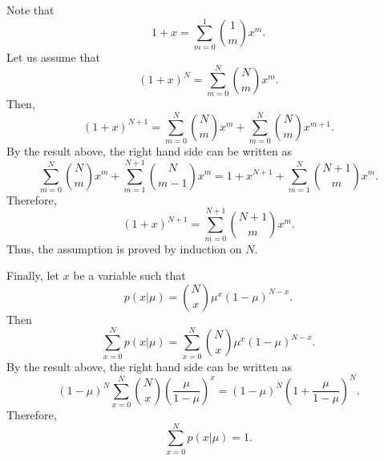 Note that 
%
\begin{equation}
1 + x = \sum_{m = 0}^{1} {1 \choose m} x ^ m.
\end{equation}
%
Let us assume that 
%
\begin{equation}
(1 + x) ^ N = \sum_{m = 0}^{N} {N \choose m} x ^ m.
\end{equation}
%
Then,
%
\begin{equation}
(1 + x) ^ {N + 1} = \sum_{m = 0}^{N} {N \choose m} x ^ m + \sum_{m = 0}^{N} {N \choose m} x ^ {m + 1}.
\end{equation}
%
By the result above, the right hand side can be written as
%
\begin{equation}
\sum_{m = 0}^{N} {N \choose m} x ^ m + \sum_{m = 1}^{N + 1} {N \choose m - 1} x ^ m = 1 + x ^ {N + 1} + \sum_{m = 1}^{N} {N + 1 \choose m} x ^ m.
\end{equation}
%
Therefore,
%
\begin{equation}
(1 + x) ^ {N + 1} = \sum_{m = 0}^{N + 1} {N + 1 \choose m} x ^ m.
\end{equation}
%
Thus, the assumption is proved by induction on $N$.

Finally, let $x$ be a variable such that
%
\begin{equation}
p(x | \mu) = {N \choose x} \mu ^ x (1 - \mu) ^ {N - x}.
\end{equation}
%
Then
%
\begin{equation}
\sum_{x = 0}^{N} p(x | \mu) = \sum_{x = 0}^{N} {N \choose x} \mu ^ x (1 - \mu) ^ {N - x}.
\end{equation}
%
By the result above, the right hand side can be written as
%
\begin{equation}
(1 - \mu) ^ N \sum_{x = 0}^{N} {N \choose x} \left( \frac{\mu}{1 - \mu} \right) ^ x = (1 - \mu) ^ N \left( 1 + \frac{\mu}{1 - \mu} \right) ^ N.
\end{equation}
%
Therefore,
%
\begin{equation}
\sum_{x = 0}^{N} p(x | \mu) = 1.
\end{equation}
%



